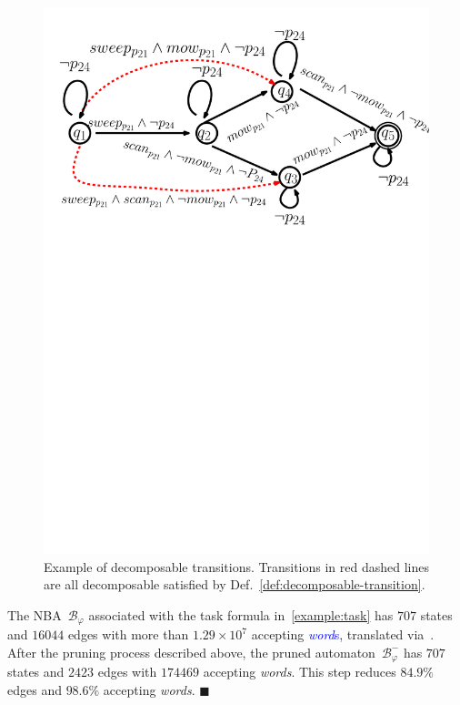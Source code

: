 

\begin{figure}
\centering
\includegraphics[scale=0.35]{figures/example_decomposable.pdf}
\caption{
Example of decomposable transitions.
Transitions in red dashed lines are all
decomposable satisfied by Def.~\ref{def:decomposable-transition}.}
\label{fig:example_decomposable}
\end{figure}

\begin{example}\label{eq:prune-nba}
The NBA~$\mathcal{B}_{\varphi}$ associated with the task formula in~\eqref{example:task}
has $707$ states and $16044$ edges with more than $1.29\times10^7$ accepting \textcolor{blue}{\emph{word}s},
translated via~\citep{gastin2001fast}.
After the pruning process described above, the pruned automaton~$\mathcal{B}^{-}_{\varphi}$
has $707$ states and $2423$ edges with $174469$ accepting \emph{words}. This step reduces $84.9\%$ edges and $98.6\%$
accepting \emph{words}.
\hfill $\blacksquare$
\end{example}
